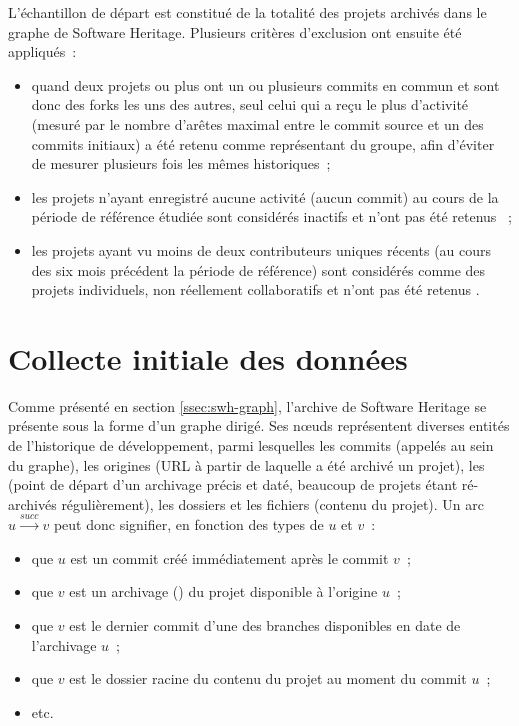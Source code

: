 L'échantillon de départ est constitué de la totalité des projets archivés dans le graphe de Software Heritage.
Plusieurs critères d'exclusion ont ensuite été appliqués :

\begin{itemize}
    \item quand deux projets ou plus ont un ou plusieurs \glspl{commit} en commun et sont donc des
        \glspl{fork} les uns des autres, seul celui qui a reçu le plus d'activité (mesuré par le nombre
        d'arêtes maximal entre le \gls{commit} source et un des \glspl{commit} initiaux) a été retenu comme
        représentant du groupe, afin d'éviter de mesurer plusieurs fois les mêmes historiques ;
    \item les projets n'ayant enregistré aucune activité (aucun \gls{commit}) au cours de la période de
        référence étudiée sont considérés inactifs et n'ont pas été retenus
        \parencite[voir][]{mining-github-2014} ;
    \item les projets ayant vu moins de deux contributeurs uniques récents (au cours des six mois précédent la
        période de référence) sont considérés comme des projets individuels, non réellement collaboratifs et
        n'ont pas été retenus \parencite[voir][]{mining-github-2014}.
\end{itemize}

\section{Collecte initiale des données}

Comme présenté en section \ref{ssec:swh-graph}, l'archive de Software Heritage se présente sous la forme d'un
graphe dirigé. Ses nœuds représentent diverses entités de l'historique de développement, parmi lesquelles les
\glspl{commit} (appelés  au sein du graphe), les origines (URL à partir de laquelle a été
archivé un projet), les  (point de départ d'un archivage précis et daté, beaucoup de projets
étant ré-archivés régulièrement), les dossiers et les fichiers (contenu du projet). Un arc $u
\xrightarrow{succ} v$ peut donc signifier, en fonction des types de $u$ et $v$ : 

\begin{itemize}
    \item que $u$ est un \gls{commit} créé immédiatement après le \gls{commit} $v$ ;
    \item que $v$ est un archivage () du projet disponible à l'origine $u$ ;
    \item que $v$ est le dernier \gls{commit} d'une des branches disponibles en date de l'archivage $u$ ;
    \item que $v$ est le dossier racine du contenu du projet au moment du \gls{commit} $u$ ;
    \item etc.
\end{itemize}

